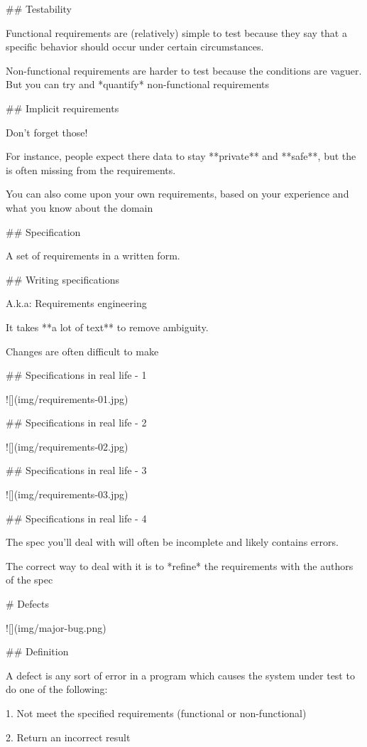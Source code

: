 ## Testability

Functional requirements are (relatively) simple to test
because  they say that a specific behavior should occur under
certain circumstances.

Non-functional requirements are harder to test because
the conditions are vaguer. But you can try and
*quantify* non-functional requirements

## Implicit requirements

Don't forget those!

For instance, people expect there data to stay **private** and **safe**,
but the is often missing from the requirements.

You can also come upon your own requirements, based on your
experience and what you know about the domain

## Specification

A set of requirements in a written form.

## Writing specifications

A.k.a: Requirements engineering

It takes **a lot of text** to remove ambiguity.

Changes are often difficult to make

## Specifications in real life - 1

![](img/requirements-01.jpg)

## Specifications in real life - 2

![](img/requirements-02.jpg)

## Specifications in real life - 3

![](img/requirements-03.jpg)

## Specifications in real life - 4

The spec you'll deal with  will often be incomplete and likely contains
errors.

\vfill

The correct way to deal with it is to *refine* the requirements with
the authors of the spec


# Defects

![](img/major-bug.png)

## Definition

A defect is any sort of error in a
program which causes the system
under test to do one of the
following:

1. Not meet the specified
requirements (functional or
non-functional)

2. Return an incorrect result


